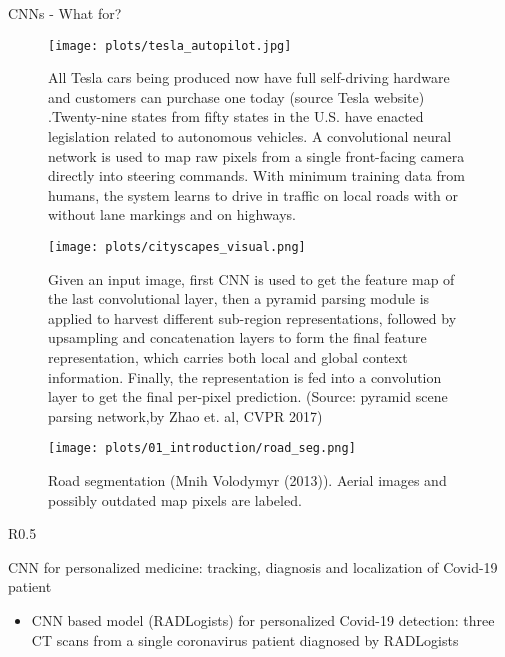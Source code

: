 
\begin{vbframe}{CNNs - What for?}
  \begin{figure}
    \centering
    \texttt{[image: plots/tesla\_autopilot.jpg]}
    \caption{All Tesla cars being produced now have full self-driving hardware and customers can purchase one today (source Tesla website) .Twenty-nine states from fifty states in the U.S. have enacted legislation related to autonomous vehicles. A convolutional neural network is used to map raw pixels from a single front-facing camera directly into steering commands. With minimum training data from humans, the system learns to drive in traffic on local roads with or without lane markings and on highways.}
  \end{figure}
\framebreak

  \begin{figure}
    \centering
    \texttt{[image: plots/cityscapes\_visual.png]}
    \caption{Given an input image, first CNN is used to get the feature map of the last convolutional layer, then a pyramid parsing module is applied to harvest different sub-region representations, followed by upsampling and concatenation layers to form the final feature representation, which carries both local and global context information. Finally, the representation is fed into a convolution layer to get the final per-pixel prediction. (Source: pyramid scene parsing network,by Zhao et. al, CVPR 2017) }
  \end{figure}
\framebreak

  \begin{figure}
    \centering
    \texttt{[image: plots/01\_introduction/road\_seg.png]}
    \caption{Road segmentation (Mnih Volodymyr (2013)). Aerial images and possibly outdated map pixels are labeled.}
  \end{figure}
\framebreak

\begin{wrapfigure}{R}{0.5\textwidth}
  \centering
\end{wrapfigure}

{CNN for personalized medicine: tracking, diagnosis and localization of Covid-19 patient}
  \begin{itemize}
    \item CNN based model (RADLogists) for personalized Covid-19 detection: three CT scans from a single coronavirus patient diagnosed by RADLogists 
  \end{itemize}
  

\end{vbframe}
